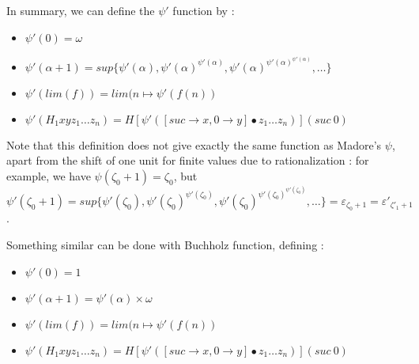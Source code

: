 \documentclass[10pt]{article}
\begin{document}
\bigskip

In summary, we can define the \( \psi' \) function by :

\begin{itemize}
     \setlength{\itemsep}{1pt}
     \setlength{\parskip}{0pt}
     \setlength{\parsep}{0pt}

\item \( \psi'(0) = \omega \)

\item \( \psi'(\alpha+1) = sup \lbrace \psi'(\alpha), \psi'(\alpha)^{\psi'(\alpha)}, \psi'(\alpha)^{\psi'(\alpha)^{\psi'(\alpha)}}, \ldots \rbrace \)

\item  \( \psi'(lim(f)) = lim(n \mapsto \psi'(f(n)) \)

\item \( \psi' (H_1 x y z_1 \ldots z_n) = H [\psi'([suc \rightarrow x, 0 \rightarrow y] \bullet z_1 \ldots z_n)] (suc\ 0) \)

\end{itemize}

Note that this definition does not give exactly the same function as Madore's \( \psi \), apart from the shift of one unit for finite values due to rationalization : for example, we have \( \psi(\zeta_0+1) = \zeta_0 \), but \( \psi'(\zeta_0+1) = sup \lbrace \psi'(\zeta_0), \psi'(\zeta_0)^{\psi'(\zeta_0)}, \psi'(\zeta_0)^{\psi'(\zeta_0)^{\psi'(\zeta_0)}}, \ldots \rbrace = \varepsilon_{\zeta_0+1} = \varepsilon'_{\zeta'_1+1} \).

\bigskip

Something similar can be done with Buchholz function, defining :

\begin{itemize}
     \setlength{\itemsep}{1pt}
     \setlength{\parskip}{0pt}
     \setlength{\parsep}{0pt}

\item \( \psi'(0) = 1 \)

\item \( \psi'(\alpha+1) = \psi'(\alpha) \times \omega \)

\item \( \psi'(lim(f)) = lim(n \mapsto \psi'(f(n)) \)

\item \( \psi' (H_1 x y z_1 \ldots z_n) = H [\psi'([suc \rightarrow x, 0 \rightarrow y] \bullet z_1 \ldots z_n)] (suc\ 0) \)

\end{itemize}
\end{document}
